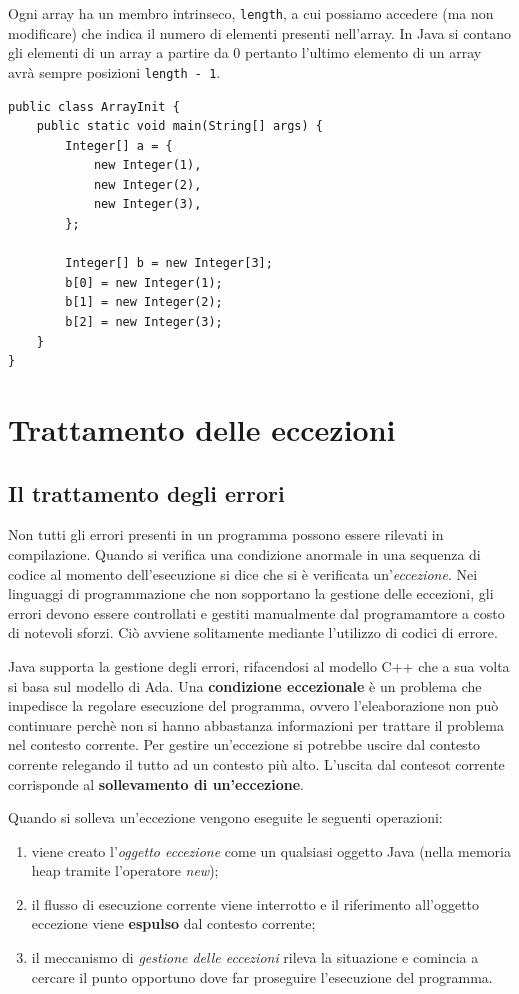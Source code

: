 \documentclass[12pt]{report}
\begin{document}
Ogni array ha un membro intrinseco, \texttt{length}, a cui possiamo accedere (ma non modificare) che indica il numero di elementi presenti nell'array. In Java si contano gli elementi di un array a partire da 0 pertanto l'ultimo elemento di un array avrà sempre posizioni \texttt{length - 1}.
\begin{lstlisting}[style=javastyle]
public class ArrayInit {
	public static void main(String[] args) {
		Integer[] a = {
			new Integer(1),
			new Integer(2),
			new Integer(3),
		};

		Integer[] b = new Integer[3];
		b[0] = new Integer(1);
		b[1] = new Integer(2);
		b[2] = new Integer(3);
	}
}
\end{lstlisting}
\section{Trattamento delle eccezioni}
\subsection{Il trattamento degli errori}
Non tutti gli errori presenti in un programma possono essere rilevati in compilazione. Quando si verifica una condizione anormale in una sequenza di codice al momento dell'esecuzione si dice che si è verificata un'\textit{eccezione}. Nei linguaggi di programmazione che non sopportano la gestione delle eccezioni, gli errori devono essere controllati e gestiti manualmente dal programamtore a costo di notevoli sforzi. Ciò avviene solitamente mediante l'utilizzo di codici di errore.

Java supporta la gestione degli errori, rifacendosi al modello C++ che a sua volta si basa sul modello di Ada. Una \textbf{condizione eccezionale} è un problema che impedisce la regolare esecuzione del programma, ovvero l'eleaborazione non può continuare perchè non si hanno abbastanza informazioni per trattare il problema nel contesto corrente. Per gestire un'eccezione si potrebbe uscire dal contesto corrente relegando il tutto ad un contesto più alto. L'uscita dal contesot corrente corrisponde al \textbf{sollevamento di un'eccezione}.

Quando si solleva un'eccezione vengono eseguite le seguenti operazioni:
\begin{enumerate}
	\item viene creato l'\textit{oggetto eccezione} come un qualsiasi oggetto Java (nella memoria heap tramite l'operatore \textit{new});
	\item il flusso di esecuzione corrente viene interrotto e il riferimento all'oggetto eccezione viene \textbf{espulso} dal contesto corrente;
	\item il meccanismo di \textit{gestione delle eccezioni} rileva la situazione e comincia a cercare il punto opportuno dove far proseguire l'esecuzione del programma.
\end{enumerate}
\end{document}
